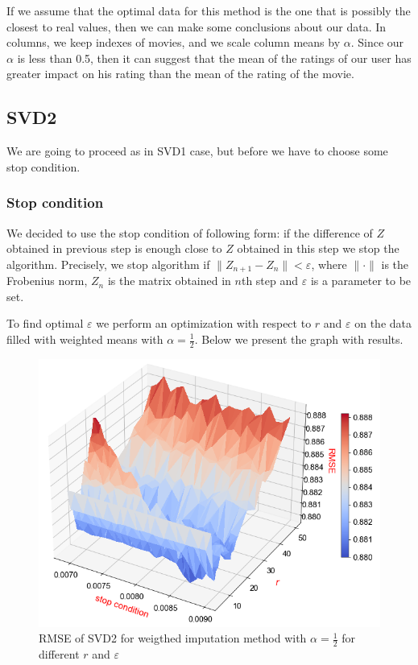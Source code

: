 \documentclass[10pt]{amsart}
\begin{document}
If we assume that the optimal data for this method is the one that is possibly the closest to real values, then we can make some conclusions about our data.
In columns, we keep indexes of movies, and we scale column means by $\alpha$.
Since our $\alpha$ is less than 0.5, then it can suggest that the mean of the ratings of our user has greater impact on his rating than the mean of the rating of the movie.







\subsection*{SVD2}
We are going to proceed as in SVD1 case, but before we have to choose some stop condition.

\subsubsection*{Stop condition}
We decided to use the stop condition of following form: if the difference of $Z$ obtained in previous step is enough close to $Z$ obtained in this step we stop the algorithm.
Precisely, we stop algorithm if $\|Z_{n+1} - Z_n\| < \varepsilon$, where $\|\cdot\|$ is the Frobenius norm, $Z_n$ is the matrix obtained in $n$th step and $\varepsilon$ is a parameter to be set.

To find optimal $\varepsilon$ we perform an optimization with respect to $r$ and $\varepsilon$
on the data filled with weighted means with $\alpha = \frac{1}{2}$.
Below we present the graph with results.

\begin{figure}[H]
    \includegraphics[scale=0.54]{svd2_stop2}
    \caption{RMSE of SVD2 for weigthed imputation method with $\alpha = \frac{1}{2}$ for different $r$ and $\varepsilon$}
\end{figure}
\end{document}
